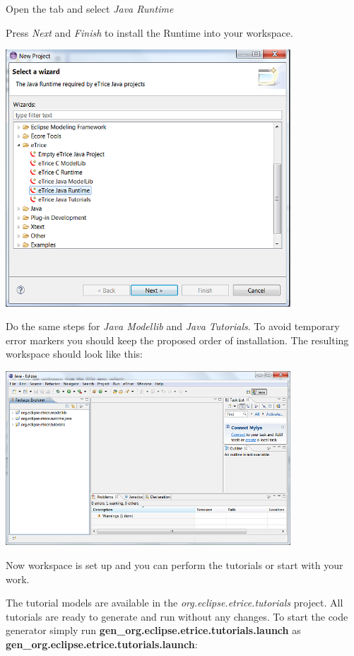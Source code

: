 Open the \textit{\eTrice{}} tab and select \textit{\eTrice{} Java Runtime}

Press \textit{Next} and \textit{Finish} to install the Runtime into your workspace.

\includegraphics[width=0.8\textwidth]{images/013-SetupWorkspace03.png}

Do the same steps for \textit{\eTrice{} Java Modellib} and \textit{\eTrice{} Java Tutorials}. To avoid temporary 
error markers you should keep the proposed order of installation. The resulting workspace should look like 
this:

\includegraphics[width=0.8\textwidth]{images/013-SetupWorkspace04.png}

Now workspace is set up and you can perform the tutorials or start with your work.

The tutorial models are available in the \textit{org.eclipse.etrice.tutorials} project. All tutorials are 
ready to generate and run without any changes. To start the code generator simply run 
\textbf{gen\_org.eclipse.etrice.tutorials.launch} as \textbf{gen\_org.eclipse.etrice.tutorials.launch}: 

